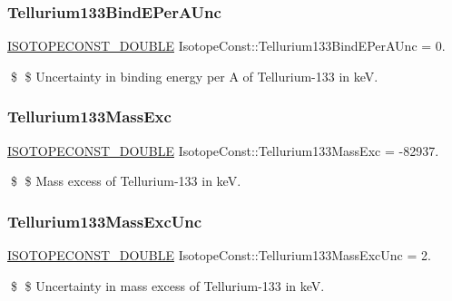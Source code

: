 \subsubsection{\texorpdfstring{Tellurium133\+Bind\+E\+Per\+A\+Unc}{Tellurium133BindEPerAUnc}}
{\footnotesize\ttfamily \mbox{\hyperlink{group___isotope_const-_macros_ga8f45a7272ce02c0b4c65c44636ed719a}{I\+S\+O\+T\+O\+P\+E\+C\+O\+N\+S\+T\+\_\+\+D\+O\+U\+B\+LE}} Isotope\+Const\+::\+Tellurium133\+Bind\+E\+Per\+A\+Unc = 0.}

\$ \$ Uncertainty in binding energy per A of Tellurium-\/133 in keV. \mbox{\label{group___isotope_const-_tellurium-_te133_gaf7ef407bec4f8c744f873d77eccce3ef}} 
\subsubsection{\texorpdfstring{Tellurium133\+Mass\+Exc}{Tellurium133MassExc}}
{\footnotesize\ttfamily \mbox{\hyperlink{group___isotope_const-_macros_ga8f45a7272ce02c0b4c65c44636ed719a}{I\+S\+O\+T\+O\+P\+E\+C\+O\+N\+S\+T\+\_\+\+D\+O\+U\+B\+LE}} Isotope\+Const\+::\+Tellurium133\+Mass\+Exc = -\/82937.}

\$ \$ Mass excess of Tellurium-\/133 in keV. \mbox{\label{group___isotope_const-_tellurium-_te133_ga62ad21c5b37dc49c8d45a424acced3d9}} 
\subsubsection{\texorpdfstring{Tellurium133\+Mass\+Exc\+Unc}{Tellurium133MassExcUnc}}
{\footnotesize\ttfamily \mbox{\hyperlink{group___isotope_const-_macros_ga8f45a7272ce02c0b4c65c44636ed719a}{I\+S\+O\+T\+O\+P\+E\+C\+O\+N\+S\+T\+\_\+\+D\+O\+U\+B\+LE}} Isotope\+Const\+::\+Tellurium133\+Mass\+Exc\+Unc = 2.}

\$ \$ Uncertainty in mass excess of Tellurium-\/133 in keV. \mbox{\label{group___isotope_const-_tellurium-_te133_gaa91a2f091d55ff2b1ed57d9d4196938a}} 

